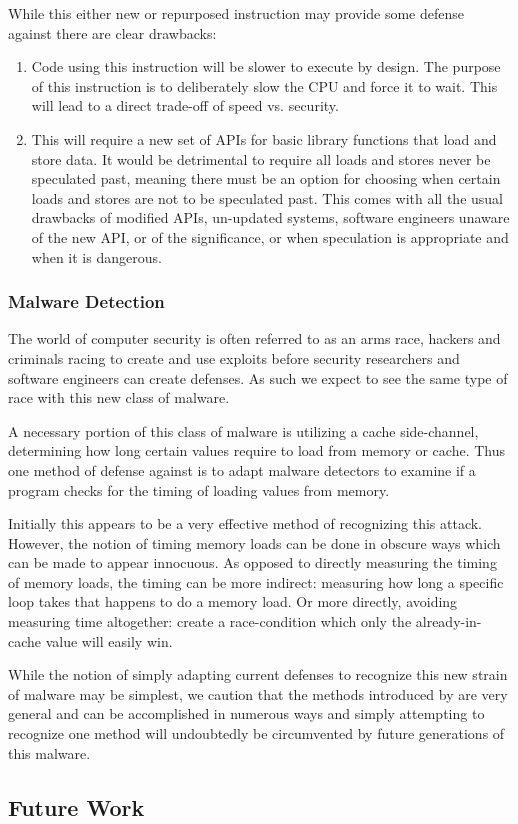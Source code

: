 While this either new or repurposed instruction may provide some defense
against \speculake there are clear drawbacks: 
\begin{enumerate}
    \item Code using this instruction will be slower to execute by design. The
    purpose of this instruction is to deliberately slow the CPU and force it to
    wait. This will lead to a direct trade-off of speed vs. security.

    \item This will require a new set of APIs for basic library functions that
    load and store data. It would be detrimental to require all loads and stores
    never be speculated past, meaning there must be an option for choosing when
    certain loads and stores are not to be speculated past. This comes with all
    the usual drawbacks of modified APIs, un-updated systems, software engineers
    unaware of the new API, or of the significance, or when speculation is
    appropriate and when it is dangerous.
\end{enumerate}

\subsubsection{Malware Detection}
The world of computer security is often referred to as an arms race, hackers and
criminals racing to create and use exploits before security researchers and
software engineers can create defenses. As such we expect to see the same type
of race with this new class of malware. 

A necessary portion of this class of malware is utilizing a cache side-channel,
determining how long certain values require to load from memory or cache. Thus
one method of defense against \speculake is to adapt malware detectors to
examine if a program checks for the timing of loading values from memory. 

Initially this appears to be a very effective method of recognizing this attack.
However, the notion of timing memory loads can be done in obscure ways which can
be made to appear innocuous. As opposed to directly measuring the timing of
memory loads, the timing can be more indirect: measuring how long a specific
loop takes that happens to do a memory load. Or more directly, avoiding
measuring time altogether: create a race-condition which only the
already-in-cache value will easily win.

While the notion of simply adapting current defenses to recognize this new
strain of malware may be simplest, we caution that the methods introduced by
\speculake are very general and can be accomplished in numerous ways and simply
attempting to recognize one method will undoubtedly be circumvented by future
generations of this malware.

\subsection{Future Work}
\label{subsec:future-work}





